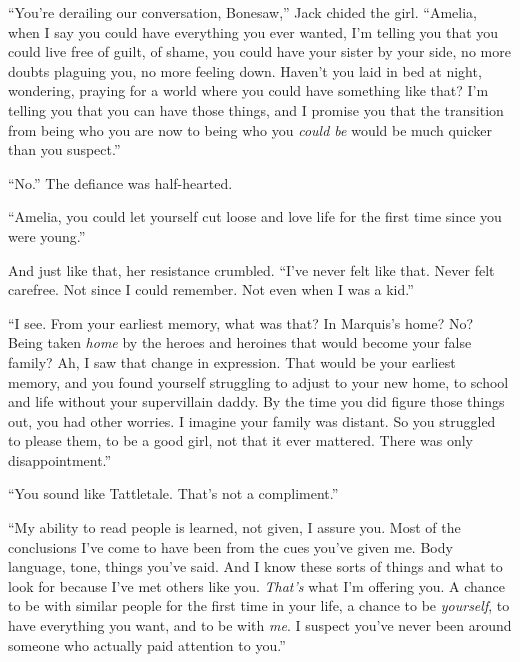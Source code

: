``You're derailing our conversation, Bonesaw,'' Jack chided the girl.  ``Amelia, when I say you could have everything you ever wanted, I'm telling you that you could live free of guilt, of shame, you could have your sister by your side, no more doubts plaguing you, no more feeling down.  Haven't you laid in bed at night, wondering, praying for a world where you could have something like that?  I'm telling you that you can have those things, and I promise you that the transition from being who you are now to being who you \emph{could be} would be much quicker than you suspect.''



``No.''  The defiance was half-hearted.



``Amelia, you could let yourself cut loose and love life for the first time since you were young.''



And just like that, her resistance crumbled.  ``I've never felt like that.  Never felt carefree.  Not since I could remember.  Not even when I was a kid.''



``I see.  From your earliest memory, what was that?  In Marquis's home?  No?  Being taken \emph{home} by the heroes and heroines that would become your false family?  Ah, I saw that change in expression.  That would be your earliest memory, and you found yourself struggling to adjust to your new home, to school and life without your supervillain daddy.  By the time you did figure those things out, you had other worries.  I imagine your family was distant.  So you struggled to please them, to be a good girl, not that it ever mattered.  There was only disappointment.''



``You sound like Tattletale.  That's not a compliment.''



``My ability to read people is learned, not given, I assure you.  Most of the conclusions I've come to have been from the cues you've given me.  Body language, tone, things you've said.  And I know these sorts of things and what to look for because I've met others like you.  \emph{That's} what I'm offering you.  A chance to be with similar people for the first time in your life, a chance to be \emph{yourself},  to have everything you want, and to be with \emph{me}.  I suspect you've never been around someone who actually paid attention to you.''



